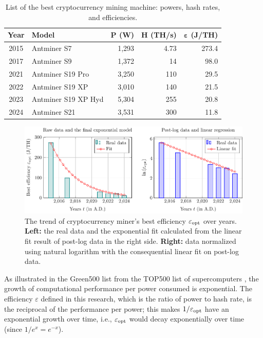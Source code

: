 \documentclass[12pt]{article}
\begin{document}
\begin{table}[!t]
	\centering
	\caption{List of the best cryptocurrency mining machine: powers, hash rates, and efficiencies.}
	\label{table_best_miners}
	\small
	\begin{tabular}{c|lrr|r}
		\hline
		\textbf{Year} & \textbf{Model} & $\boldsymbol{P}$ (W) & $\boldsymbol{H}$ (TH/s) & $\boldsymbol{\varepsilon}$ (J/TH)\\
		\hline
		2015 & Antminer S7 & 1,293 & 4.73 & 273.4 \\
		2017 & Antminer S9 & 1,372 & 14 & 98.0 \\
		2021 & Antminer S19 Pro & 3,250 & 110 & 29.5 \\
		2022 & Antminer S19 XP & 3,010 & 140 & 21.5 \\
		2023 & Antminer S19 XP Hyd & 5,304 & 255 & 20.8 \\
		2024 & Antminer S21 & 3,531 & 300 & 11.8 \\
		\hline
	\end{tabular}
\end{table}

\begin{figure}[!t]
	\centering
	\caption{The trend of cryptocurrency miner's best efficiency $\varepsilon_{\rm opt}$ over years. \textbf{Left:} the real data and the exponential fit calculated from the linear fit result of post-log data in the right side. \textbf{Right:} data normalized using natural logarithm with the consequential linear fit on post-log data.}
	\label{fig_miner_trend}
	\medskip
	\includegraphics{figures/trends/miner.pdf}
\end{figure}

As illustrated in the Green500 list from the TOP500 list of supercomputers \citep{top500}, the growth of computational performance per power consumed is exponential. The efficiency $\varepsilon$ defined in this research, which is the ratio of power to hash rate, is the reciprocal of the performance per power; this makes $1/\varepsilon_{\rm opt}$ have an exponential growth over time, i.e., $\varepsilon_{\rm opt}$ would decay exponentially over time (since $1/e^x = e^{-x}$).
\end{document}
